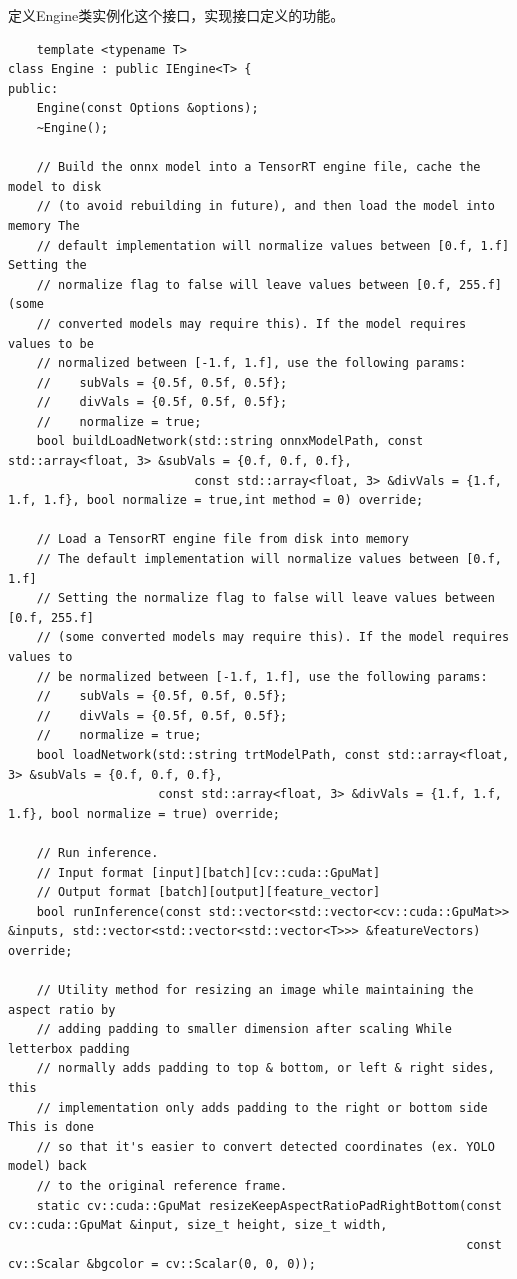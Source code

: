 定义Engine类实例化这个接口，实现接口定义的功能。
\begin{lstlisting}
	template <typename T>
class Engine : public IEngine<T> {
public:
    Engine(const Options &options);
    ~Engine();

    // Build the onnx model into a TensorRT engine file, cache the model to disk
    // (to avoid rebuilding in future), and then load the model into memory The
    // default implementation will normalize values between [0.f, 1.f] Setting the
    // normalize flag to false will leave values between [0.f, 255.f] (some
    // converted models may require this). If the model requires values to be
    // normalized between [-1.f, 1.f], use the following params:
    //    subVals = {0.5f, 0.5f, 0.5f};
    //    divVals = {0.5f, 0.5f, 0.5f};
    //    normalize = true;
    bool buildLoadNetwork(std::string onnxModelPath, const std::array<float, 3> &subVals = {0.f, 0.f, 0.f},
                          const std::array<float, 3> &divVals = {1.f, 1.f, 1.f}, bool normalize = true,int method = 0) override;

    // Load a TensorRT engine file from disk into memory
    // The default implementation will normalize values between [0.f, 1.f]
    // Setting the normalize flag to false will leave values between [0.f, 255.f]
    // (some converted models may require this). If the model requires values to
    // be normalized between [-1.f, 1.f], use the following params:
    //    subVals = {0.5f, 0.5f, 0.5f};
    //    divVals = {0.5f, 0.5f, 0.5f};
    //    normalize = true;
    bool loadNetwork(std::string trtModelPath, const std::array<float, 3> &subVals = {0.f, 0.f, 0.f},
                     const std::array<float, 3> &divVals = {1.f, 1.f, 1.f}, bool normalize = true) override;

    // Run inference.
    // Input format [input][batch][cv::cuda::GpuMat]
    // Output format [batch][output][feature_vector]
    bool runInference(const std::vector<std::vector<cv::cuda::GpuMat>> &inputs, std::vector<std::vector<std::vector<T>>> &featureVectors) override;

    // Utility method for resizing an image while maintaining the aspect ratio by
    // adding padding to smaller dimension after scaling While letterbox padding
    // normally adds padding to top & bottom, or left & right sides, this
    // implementation only adds padding to the right or bottom side This is done
    // so that it's easier to convert detected coordinates (ex. YOLO model) back
    // to the original reference frame.
    static cv::cuda::GpuMat resizeKeepAspectRatioPadRightBottom(const cv::cuda::GpuMat &input, size_t height, size_t width,
                                                                const cv::Scalar &bgcolor = cv::Scalar(0, 0, 0));


\end{lstlisting}
